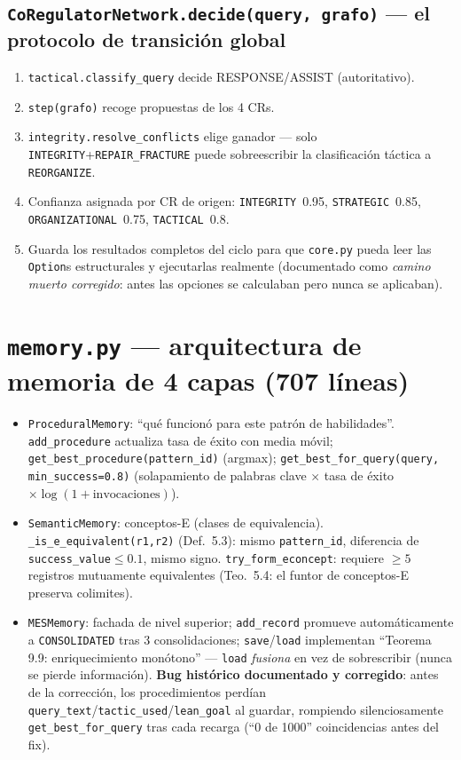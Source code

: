 \documentclass[11pt,a4paper]{report}
\newcommand{\code}[1]{\texttt{#1}}
\begin{document}
\subsection{\code{CoRegulatorNetwork.decide(query, grafo)} --- el protocolo de transici\'on global}
\begin{enumerate}
  \item \code{tactical.classify_query} decide RESPONSE/ASSIST (autoritativo).
  \item \code{step(grafo)} recoge propuestas de los 4 CRs.
  \item \code{integrity.resolve_conflicts} elige ganador --- solo \code{INTEGRITY}+\code{REPAIR_FRACTURE} puede sobreescribir la clasificaci\'on t\'actica a \code{REORGANIZE}.
  \item Confianza asignada por CR de origen: \code{INTEGRITY}~0.95, \code{STRATEGIC}~0.85, \code{ORGANIZATIONAL}~0.75, \code{TACTICAL}~0.8.
  \item Guarda los resultados completos del ciclo para que \code{core.py} pueda leer las \code{Option}s estructurales y ejecutarlas realmente (documentado como \emph{camino muerto corregido}: antes las opciones se calculaban pero nunca se aplicaban).
\end{enumerate}

\section{\code{memory.py} --- arquitectura de memoria de 4 capas (707 l\'ineas)}

\begin{itemize}
  \item \code{ProceduralMemory}: ``qu\'e funcion\'o para este patr\'on de habilidades''. \code{add_procedure} actualiza tasa de \'exito con media m\'ovil; \code{get_best_procedure(pattern_id)} (argmax); \code{get_best_for_query(query, min_success=0.8)} (solapamiento de palabras clave $\times$ tasa de \'exito $\times \log(1+\text{invocaciones})$).
  \item \code{SemanticMemory}: conceptos-E (clases de equivalencia). \code{\_is_e_equivalent(r1,r2)} (Def.~5.3): mismo \code{pattern_id}, diferencia de \code{success_value}$\le0.1$, mismo signo. \code{try_form_econcept}: requiere $\ge5$ registros mutuamente equivalentes (Teo.~5.4: el funtor de conceptos-E preserva colimites).
  \item \code{MESMemory}: fachada de nivel superior; \code{add_record} promueve autom\'aticamente a \code{CONSOLIDATED} tras 3 consolidaciones; \code{save}/\code{load} implementan ``Teorema 9.9: enriquecimiento mon\'otono'' --- \code{load} \emph{fusiona} en vez de sobrescribir (nunca se pierde informaci\'on). \textbf{Bug hist\'orico documentado y corregido}: antes de la correcci\'on, los procedimientos perd\'ian \code{query_text}/\code{tactic_used}/\code{lean_goal} al guardar, rompiendo silenciosamente \code{get_best_for_query} tras cada recarga (``0 de 1000'' coincidencias antes del fix).
\end{itemize}
\end{document}
